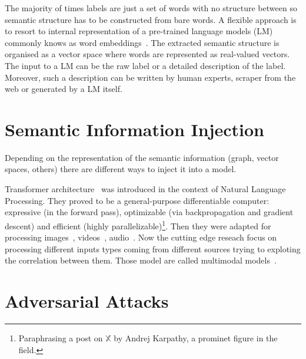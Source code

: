 The majority of times labels are just a set of words with no structure between
so semantic structure has to be constructed from bare words. A flexible approach
is to resort to internal representation of a pre-trained language models (LM)
commonly knows as word embeddings~\cite{}. The extracted semantic structure is
organised as a vector space where words are represented as real-valued vectors.
The input to a LM can be the raw label or a detailed description of the label.
Moreover, such a description can be written by human experts, scraper from the
web or generated by a LM itself.

\section{Semantic Information Injection}
\label{sec:semantic-information-injection}

Depending on the representation of the semantic information (graph, vector
spaces, others) there are different ways to inject it into a model. 


Transformer architecture~\cite{AttentionIsAlVaswan2017} was introduced in the
context of Natural Language Processing. They proved to be a general-purpose
differentiable computer: expressive (in the forward pass), optimizable (via
backpropagation and gradient descent) and efficient (highly
parallelizable)\footnote{Paraphrasing a post on $\mathbb{X}$ by Andrej
Karpathy, a prominet figure in the field.}. Then they were adapted for
processing images~\cite{ImageTransformParmar2018, EndToEndObjeCarion2020,
AnImageIsWorDosovi2020}, videos~\cite{VivitAVideoArnab2021,
TemporalContexShao2020}, audio~\cite{NeuralSpeechSLiNa2018,
SpeechTransforDong2018, ConformerConvGulati2020}.
Now the cutting edge reseach focus on processing different inputs types coming
from different sources trying to exploting the correlation between them. Those
model are called multimodal models~\cite{ASurveyOnMulYinS2023}.

\section{Adversarial Attacks}
\label{sec:adversarial-attacks}




